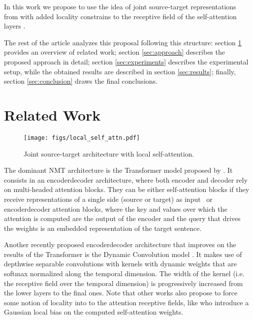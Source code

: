 \documentclass[11pt,a4paper]{article}
\begin{document}
In this work we propose to use the idea of joint source-target
representations from  with added
locality constrains \cite{wu2018dynconv} to the receptive field of the self-attention layers \cite{vaswani2017transformer}.

The rest of the article analyzes this proposal following this
structure: section \ref{sec:relatedwork} provides an overview of
related work; section \ref{sec:approach} describes the
proposed approach in detail; section \ref{sec:experiments} describes the
experimental setup, while the obtained results are described in
section \ref{sec:results}; finally, section \ref{sec:conclusion}
draws the final conclusions.

\section{Related Work} \label{sec:relatedwork}

\begin{figure*}[ht!]
\centering
\texttt{[image: figs/local\_self\_attn.pdf]}
\caption{Joint source-target architecture with local self-attention.
\label{fig:localselfattn}}
\end{figure*}


The dominant NMT architecture is the Transformer model
proposed by . It consists in an
encoder\textendash decoder architecture, where both encoder and decoder rely
on multi-headed attention blocks. They can be either self-attention
blocks \textemdash if they receive representations of a single
side (source or target) as input\textemdash ~ 
or encoder\textendash decoder attention blocks, where the key and values over
which the attention is computed are the output of the encoder and the
query that drives the weights is an embedded representation of the
target sentence. 

Another recently proposed encoder\textendash decoder architecture that
improves on the results of
the Transformer is the Dynamic Convolution model \cite{wu2018dynconv}.
It makes use of depthwise separable convolutions with kernels with dynamic
weights that are softmax normalized along the temporal dimension.
The width of the kernel (i.e. the receptive field over the temporal
dimension) is progressively increased from the lower
layers to the final ones.
Note that other works also propose to force some notion of
locality into to the attention receptive fields, like
 who introduce a Gaussian local bias
on the computed self-attention weights.
\end{document}
